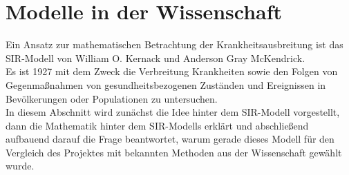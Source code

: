 \section*{Modelle in der Wissenschaft}
Ein Ansatz zur mathematischen Betrachtung der Krankheitsausbreitung ist das SIR-Modell von William O. Kernack und Anderson Gray McKendrick.\\
Es ist 1927 mit dem Zweck die Verbreitung Krankheiten sowie den Folgen von Gegenmaßnahmen von gesundheitsbezogenen Zuständen und Ereignissen in Bevölkerungen oder Populationen zu untersuchen.\cite{jdmurray}\\
In diesem Abschnitt wird zunächst die Idee hinter dem SIR-Modell vorgestellt, dann die Mathematik hinter dem SIR-Modells erklärt und abschließend aufbauend darauf die Frage beantwortet, warum gerade dieses Modell für den Vergleich des Projektes mit bekannten Methoden aus der Wissenschaft gewählt wurde.
